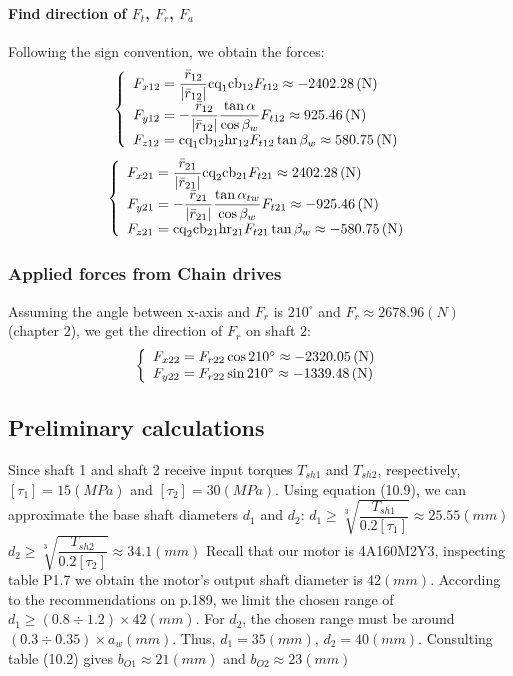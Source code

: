 \paragraph{Find direction of $ F_{t} $, $ F_r $, $ F_a $}
Following the sign convention, we obtain the forces:
\[
\left\{ 
\begin{array}{l@{{}={}}l}
F_{x12}& \dfrac{\bar{r}_{12}}{|\bar{r}_{12}|}\text{cq}_1\text{cb}_{12}F_{t12}\approx -2402.28 \unit{(N)}\\
F_{y12}& -\dfrac{\bar{r}_{12}}{|\bar{r}_{12}|}\dfrac{\tan\alpha}{\cos\beta_w}F_{t12}\approx 925.46 \unit{(N)}\\
F_{z12}& \text{cq}_1\text{cb}_{12}\text{hr}_{12}F_{t12}\tan\beta_w\approx 580.75 \unit{(N)}\\ 
\end{array}
\right.
\]
\[
\left\{ 
\begin{array}{l@{{}={}}l}
F_{x21}& \dfrac{\bar{r}_{21}}{|\bar{r}_{21}|}\text{cq}_2\text{cb}_{21}F_{t21}\approx 2402.28 \unit{(N)}\\
F_{y21}& -\dfrac{\bar{r}_{21}}{|\bar{r}_{21}|}\dfrac{\tan\alpha_{tw}}{\cos\beta_w}F_{t21}\approx -925.46 \unit{(N)}\\
F_{z21}& \text{cq}_2\text{cb}_{21}\text{hr}_{21}F_{t21}\tan\beta_w\approx -580.75 \unit{(N)}\\ 
\end{array}
\right.
\]

\subsubsection{Applied forces from Chain drives}
Assuming the angle between x-axis and $ F_r $ is $ 210^\circ $ and $ F_r \approx 2678.96 \unit{(N)} $ (chapter 2), we get the direction of $ F_r $ on shaft 2:
\[
\left\{ 
\begin{array}{l@{{}={}}l}
F_{x22}& F_{r22}\cos210^\circ\approx -2320.05 \unit{(N)}\\
F_{y22}& F_{r22}\sin210^\circ\approx -1339.48 \unit{(N)}\\
\end{array}
\right.
\]

\subsection{Preliminary calculations}
Since shaft 1 and shaft 2 receive input torques $ T_{sh1} $ and $ T_{sh2} $, respectively, $ [\tau_1] = 15\unit{(MPa)}$ and $ [\tau_2]=30\unit{(MPa)} $. Using equation (10.9), we can approximate the base shaft diameters $ d_1 $ and $ d_2 $:\vskip2mm
$ d_1 \geq \sqrt[3]{\dfrac{T_{sh1}}{0.2[\tau_1]}} \approx 25.55 \unit{(mm)}$\\
$ d_2 \geq \sqrt[3]{\dfrac{T_{sh2}}{0.2[\tau_2]}} \approx 34.1 \unit{(mm)}$\vskip2mm
Recall that our motor is 4A160M2Y3, inspecting table P1.7 we obtain the motor's output shaft diameter is $ 42 \unit{(mm)} $. According to the recommendations on p.189, we limit the chosen range of $ d_1 \geq (0.8\div1.2)\times 42\unit{(mm)} $. For $ d_2 $, the chosen range must be around $ (0.3\div0.35)\times a_w\unit{(mm)}$. Thus, $ d_1 = 35\unit{(mm)} $, $ d_2 = 40\unit{(mm)} $. Consulting table (10.2) gives $ b_{O1} \approx 21\unit{(mm)} $ and $ b_{O2} \approx 23\unit{(mm)} $


